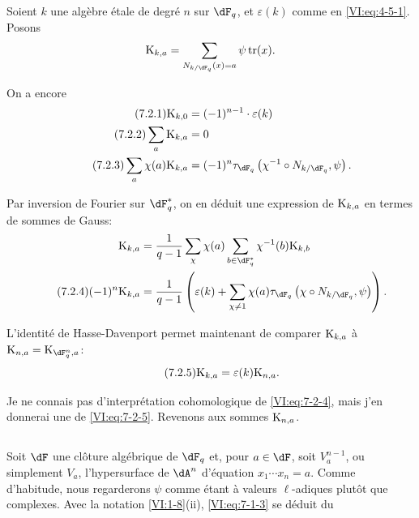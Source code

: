 \documentclass[oneside]{book}
\DeclareMathOperator{\tr}{tr}
\newcommand{\kloos}{\textnormal{K}} %
\theoremstyle{sga-source}
\theoremstyle{sga-source-dash}
\theoremstyle{sga-source-dotdash}
\theoremstyle{sga-source-number-note-dash}
\theoremstyle{sga-source-note-number-dotdash}
\theoremstyle{sga-source-example-dotdash}
\theoremstyle{sga-source-inline-number}
\theoremstyle{sga-source-bare-number}
\theoremstyle{sga-source}
\newcommand{\PrintPage}[1]{}\newcommand{\MathPage}[1]{}\newcommand{\PrintCite}[2]{#1}\newcommand{\var}[3]{#2}
\begin{document}
Soient $k$ une algèbre étale de degré $n$ sur $\dF_q$, et $\varepsilon(k)$ 
comme en \eqref{VI:eq:4-5-1}. Posons 
\[
  \kloos_{k,a} = \sum_{N_{k/\dF_q}(x)=a} \psi \tr(x) \text{.} 
\]
\PrintPage{220}
On a encore 
\begin{align*}\tag{7.2.1}\label{VI:eq:7-2-1}
  \kloos_{k,0} &= (-1)^{n-1} \cdot \varepsilon(k) \\ \tag{7.2.2}\label{VI:eq:7-2-2}
  \sum_a \kloos_{k,a} &= 0 \\ \tag{7.2.3}\label{VI:eq:7-2-3}
  \sum_a \chi(a) \kloos_{k,a} &= (-1)^n \tau_{\dF_q}\left(\chi^{-1}\circ N_{k/\dF_q},\psi\right) \text{.} 
\end{align*}

Par inversion de Fourier sur $\dF_q^\ast$, on en déduit une expression de 
$\kloos_{k,a}$ \var{en terme de sommes de Gauss}{en termes de sommes de Gauss}{S45-SOL-0933}: 
\begin{align*} 
  \kloos_{k,a} &= \frac{1}{q-1} \sum_\chi \chi(a) \sum_{b\in \dF_q^\ast} \chi^{-1}(b) \kloos_{k,b} \\ \tag{7.2.4}\label{VI:eq:7-2-4}
  (-1)^n \kloos_{k,a} &= \frac{1}{q-1} \left(\varepsilon(k) + \sum_{\chi\ne 1} \chi(a) \tau_{\dF_q}\left(\chi\circ N_{k/\dF_q},\psi\right) \right) \text{.} 
\end{align*}

L'identité de Hasse-Davenport permet maintenant de comparer $\kloos_{k,a}$ 
à $\kloos_{n,a} = \var{\kloos_{\dF_{q^n},a}}{\kloos_{\dF_q^n,a}}{S45-SOL-0934}$: 
\begin{equation*}\tag{7.2.5}\label{VI:eq:7-2-5}
  \kloos_{k,a} = \varepsilon(k) \kloos_{n,a} \text{.} 
\end{equation*}

Je ne connais pas d'interprétation cohomologique de \eqref{VI:eq:7-2-4}, mais 
j'en donnerai une de \eqref{VI:eq:7-2-5}. Revenons aux sommes $\kloos_{n,a}$. 





\subsection{}\label{VI:7-3}

Soit $\dF$ une clôture algébrique de $\dF_q$ et, pour $a\in \dF$, soit 
$V_a^{n-1}$, ou simplement $V_a$, l'hypersurface de $\dA^n$ d'équation 
$x_1 \dotsm x_n=a$. Comme d'habitude, nous regarderons $\psi$ comme étant à 
valeurs $\ell$-adiques plutôt que complexes. Avec la notation 
\ref{VI:1-8}(ii), \eqref{VI:eq:7-1-3} se déduit du 
\end{document}
